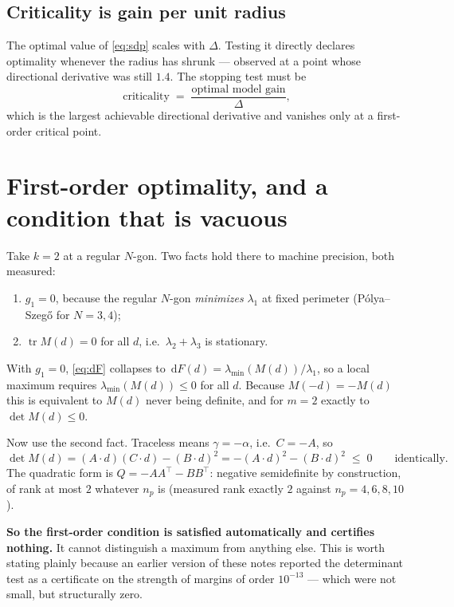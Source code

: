 \documentclass[11pt]{article}
\newcommand{\dd}{\,\mathrm{d}}
\newcommand{\lammin}{\lambda_{\min}}
\theoremstyle{definition}
\begin{document}
\subsection{Criticality is gain per unit radius}

The optimal value of \eqref{eq:sdp} scales with $\Delta$. Testing it directly declares optimality
whenever the radius has shrunk --- observed at a point whose directional derivative was still
$1.4$. The stopping test must be
\[
  \text{criticality}\;=\;\frac{\text{optimal model gain}}{\Delta},
\]
which is the largest achievable directional derivative and vanishes only at a first-order
critical point.

\section{First-order optimality, and a condition that is vacuous}\label{sec:vacuous}

Take $k=2$ at a regular $N$-gon. Two facts hold there to machine precision, both measured:
\begin{enumerate}
\item $g_1=0$, because the regular $N$-gon \emph{minimizes} $\lambda_1$ at fixed perimeter
  (P\'olya--Szeg\H{o} for $N=3,4$);
\item $\operatorname{tr}M(d)=0$ for all $d$, i.e.\ $\lambda_2+\lambda_3$ is stationary.
\end{enumerate}
With $g_1=0$, \eqref{eq:dF} collapses to $\dd F(d)=\lammin(M(d))/\lambda_1$, so a local maximum
requires $\lammin(M(d))\le0$ for all $d$. Because $M(-d)=-M(d)$ this is equivalent to $M(d)$
never being definite, and for $m=2$ exactly to $\det M(d)\le0$.

Now use the second fact. Traceless means $\gamma=-\alpha$, i.e.\ $C=-A$, so
\begin{equation}\label{eq:autodet}
  \det M(d)=(A\!\cdot\!d)(C\!\cdot\!d)-(B\!\cdot\!d)^2
  =-(A\!\cdot\!d)^2-(B\!\cdot\!d)^2\;\le\;0 \qquad\text{identically.}
\end{equation}
The quadratic form is $Q=-AA^{\!\top}-BB^{\!\top}$: negative semidefinite by construction, of
rank at most $2$ whatever $n_p$ is (measured rank exactly $2$ against $n_p=4,6,8,10$).

\medskip
\noindent\textbf{So the first-order condition is satisfied automatically and certifies nothing.}
It cannot distinguish a maximum from anything else. This is worth stating plainly because an
earlier version of these notes reported the determinant test as a certificate on the strength of
margins of order $10^{-13}$ --- which were not small, but structurally zero.
\end{document}
